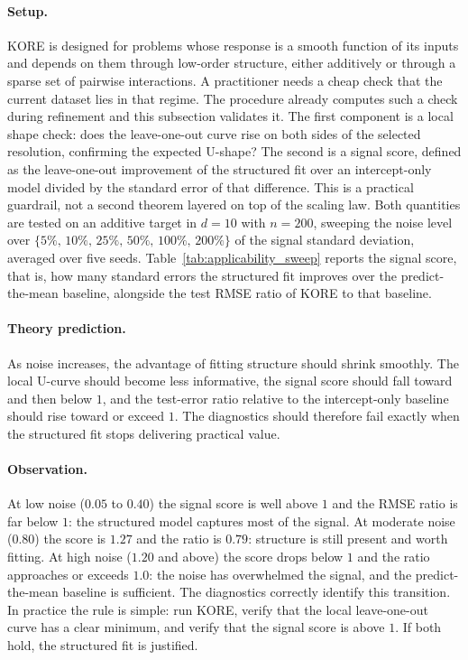\documentclass{article}
\newcommand{\KORE}{\textsc{KORE}}
\begin{document}
\paragraph{Setup.}
\KORE{} is designed for problems whose response is a smooth function of its inputs and depends on them through low-order structure, either additively or through a sparse set of pairwise interactions. A practitioner needs a cheap check that the current dataset lies in that regime. The procedure already computes such a check during refinement and this subsection validates it. The first component is a local shape check: does the leave-one-out curve rise on both sides of the selected resolution, confirming the expected U-shape? The second is a signal score, defined as the leave-one-out improvement of the structured fit over an intercept-only model divided by the standard error of that difference. This is a practical guardrail, not a second theorem layered on top of the scaling law. Both quantities are tested on an additive target in $d = 10$ with $n = 200$, sweeping the noise level over $\{5\%,\,10\%,\,25\%,\,50\%,\,100\%,\,200\%\}$ of the signal standard deviation, averaged over five seeds. Table~\ref{tab:applicability_sweep} reports the signal score, that is, how many standard errors the structured fit improves over the predict-the-mean baseline, alongside the test RMSE ratio of \KORE{} to that baseline.

\paragraph{Theory prediction.}
As noise increases, the advantage of fitting structure should shrink smoothly. The local U-curve should become less informative, the signal score should fall toward and then below $1$, and the test-error ratio relative to the intercept-only baseline should rise toward or exceed $1$. The diagnostics should therefore fail exactly when the structured fit stops delivering practical value.

\paragraph{Observation.}
At low noise ($0.05$ to $0.40$) the signal score is well above $1$ and the RMSE ratio is far below $1$: the structured model captures most of the signal. At moderate noise ($0.80$) the score is $1.27$ and the ratio is $0.79$: structure is still present and worth fitting. At high noise ($1.20$ and above) the score drops below $1$ and the ratio approaches or exceeds $1.0$: the noise has overwhelmed the signal, and the predict-the-mean baseline is sufficient. The diagnostics correctly identify this transition. In practice the rule is simple: run \KORE{}, verify that the local leave-one-out curve has a clear minimum, and verify that the signal score is above $1$. If both hold, the structured fit is justified.
\end{document}
